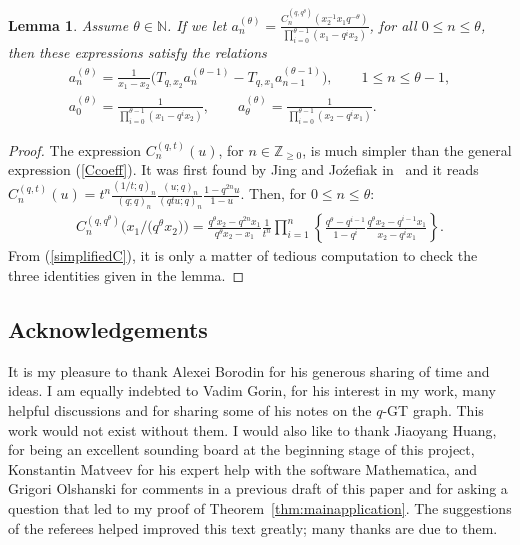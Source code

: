 \documentclass[pdftex]{sigma}
\numberwithin{equation}{section}
\newtheorem{lem}[thm]{Lemma}
\newcommand{\Z}{\mathbb{Z}}
\newcommand{\N}{\mathbb{N}}
\begin{document}
\begin{lem}\label{Cprop3}Assume $\theta\in\N$. If we let $a_n^{(\theta)} = \frac{C_n^{(q, q^{\theta})}(x_2^{-1}x_1q^{-\theta})}{\prod\limits_{i=0}^{\theta-1}{(x_1 - q^ix_2)}}$, for all $0\leq n\leq \theta$, then these expressions satisfy the relations
\begin{gather*}
a_n^{(\theta)} = \frac{1}{x_1 - x_2} \big( T_{q, x_2} a_n^{(\theta - 1)} - T_{q, x_1} a_{n-1}^{(\theta - 1)} \big), \qquad 1\leq n\leq \theta-1,\\
a_0^{(\theta)} = \frac{1}{\prod\limits_{i=0}^{\theta - 1}{(x_1 - q^i x_2)}}, \qquad a_{\theta}^{(\theta)} = \frac{1}{\prod\limits_{i=0}^{\theta - 1}{(x_2 - q^i x_1)}}.
\end{gather*}
\end{lem}
\begin{proof}
The expression $C_n^{(q, t)}(u)$, for $n\in\Z_{\geq 0}$, is much simpler than the general expression (\ref{Ccoeff}). It was f\/irst found by Jing and Jo\'zef\/iak in~\cite{JJ} and it reads $C_n^{(q, t)}(u) = t^n\frac{(1/t; q)_n}{(q; q)_n}\frac{(u; q)_n}{(qtu; q)_n}\frac{1 - q^{2n}u}{1-u}$. Then, for $0\leq n\leq \theta$:
\begin{gather}\label{simplifiedC}
C_n^{(q, q^{\theta})}\big(x_1/\big(q^{\theta}x_2\big)\big) = \frac{q^{\theta}x_2 - q^{2n}x_1}{q^{\theta}x_2 - x_1}\frac{1}{t^n}\prod_{i=1}^n{\left\{\frac{q^{\theta} - q^{i-1}}{1 - q^i}\frac{q^{\theta}x_2 - q^{i-1}x_1}{x_2 - q^ix_1}\right\}}.
\end{gather}
From (\ref{simplifiedC}), it is only a matter of tedious computation to check the three identities given in the lemma.
\end{proof}

\subsection*{Acknowledgements}

It is my pleasure to thank Alexei Borodin for his generous sharing of time and ideas. I am equally indebted to Vadim Gorin, for his interest in my work, many helpful discussions and for sharing some of his notes on the $q$-GT graph. This work would not exist without them. I would also like to thank Jiaoyang Huang, for being an excellent sounding board at the beginning stage of this project, Konstantin Matveev for his expert help with the software Mathematica, and Grigori Olshanski for comments in a previous draft of this paper and for asking a question that led to my proof of Theorem~\ref{thm:mainapplication}.
The suggestions of the referees helped improved this text greatly; many thanks are due to them.
\end{document}
